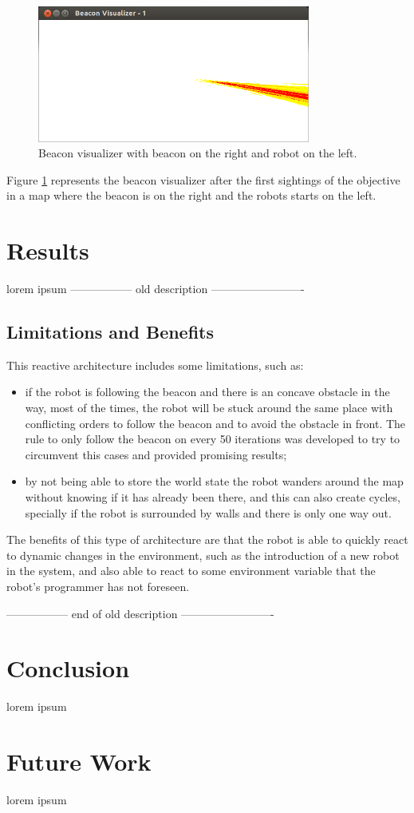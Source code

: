 \documentclass[oribibl]{llncs}
\begin{document}
\begin{figure}
  \centering
  \includegraphics[width=0.8\textwidth]{beacon-1.png}
  \caption{Beacon visualizer with beacon on the right and robot on the left.}
  \label{fig:beacon1}
\end{figure}

Figure \ref{fig:beacon1} represents the beacon visualizer after the first sightings of the objective
in a map where the beacon is on the right and the robots starts on the left.

\section{Results}
lorem ipsum
----------------- old description -------------------------
\subsection{Limitations and Benefits}
This reactive architecture includes some limitations, such as:

\begin{itemize}
  \item if the robot is following the beacon and there is an concave obstacle in the way, most of the times, the robot will be stuck around the same place with conflicting orders to follow the beacon and to avoid the obstacle in front. The rule to only follow the beacon on every 50 iterations was developed to try to circumvent this cases and provided promising results;
  \item by not being able to store the world state the robot wanders around the map without knowing if it has already been there, and this can also create cycles, specially if the robot is surrounded by walls and there is only one way out.
\end{itemize}

The benefits of this type of architecture are that the robot is able to quickly react to dynamic changes in the environment, such as the introduction of a new robot in the system, and also able to react to some environment variable that the robot's programmer has not foreseen.

----------------- end of old description -------------------------


\section{Conclusion}
lorem ipsum

\section{Future Work}
lorem ipsum


\end{document}
